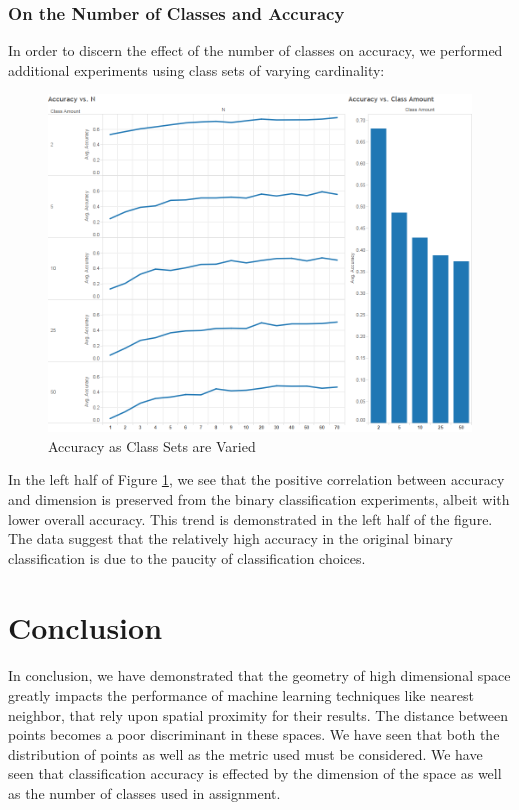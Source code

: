 \documentclass{article}
\begin{document}
\subsubsection{On the Number of Classes and Accuracy}
In order to discern the effect of the number of classes on accuracy, we performed additional experiments using class sets of varying cardinality:
\begin{figure}[H]
    \centering
        \includegraphics[width=\textwidth]{exp1-2-varying_classes.png}
    \caption{Accuracy as Class Sets are Varied}\label{fig:exp1-2-varclass}
\end{figure}
In the left half of Figure \ref{fig:exp1-2-varclass}, we see that the positive correlation between accuracy and dimension is preserved from the binary classification experiments, albeit with lower overall accuracy. This trend is demonstrated in the left half of the figure. The data suggest that the relatively high accuracy in the original binary classification is due to the paucity of classification choices.
\section{Conclusion}
\paragraph{}
In conclusion, we have demonstrated that the geometry of high dimensional space greatly impacts the performance of machine learning techniques like nearest neighbor, that rely upon spatial proximity for their results. The distance between points becomes a poor discriminant in these spaces. We have seen that both the distribution of points as well as the metric used must be considered. We have seen that classification accuracy is effected by the dimension of the space as well as the number of classes used in assignment.
\end{document}

